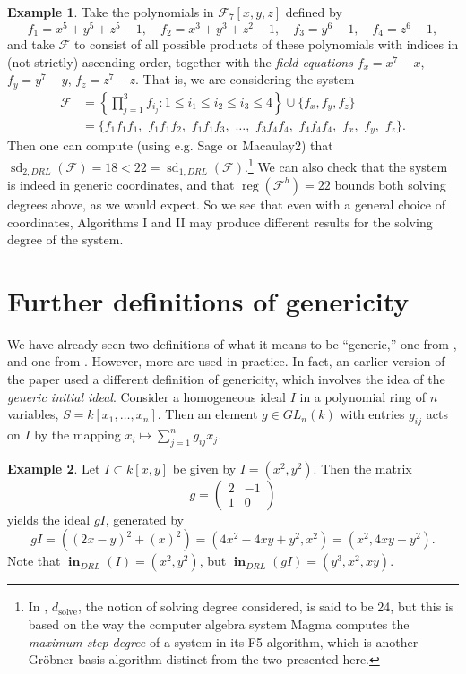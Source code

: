\documentclass[11pt]{article}
\newcommand{\F}{\mathcal{F}}
\DeclareMathOperator{\Init}{\mathbf{in}}
\DeclareMathOperator{\sd}{sd}
\DeclareMathOperator{\reg}{reg}
\theoremstyle{definition}
\newtheorem{example}{Example}
\begin{document}
\begin{example}
	Take the polynomials in $\mathbb{\F}_7[x,y,z]$ defined by \[ f_1 = x^5 + y^5 + z^5 - 1, \quad f_2 = x^3 + y^3 + z^2 - 1, \quad f_3 = y^6 - 1, \quad f_4 = z^6 - 1, \] and take $\F$ to consist of all possible products of these polynomials with indices in (not strictly) ascending order, together with the \emph{field equations} $f_x = x^7 - x$, $f_y = y^7 - y$, $f_z = z^7 - z$. That is, we are considering the system \begin{align*}
		\F &= \left\{ \prod_{j = 1}^3 f_{i_j} : 1 \leq i_1 \leq i_2 \leq i_3 \leq 4 \right\} \cup \{f_x, f_y, f_z\} \\
		&= \{f_1 f_1 f_1, \,\, f_1 f_1 f_2, \,\, f_1 f_1 f_3, \,\, \dots, \,\, f_3 f_4 f_4, \,\, f_4 f_4 f_4, \,\, f_x, \,\, f_y, \,\, f_z\}. 
	\end{align*} Then one can compute (using e.g. Sage or Macaulay2) that $\sd_{2,DRL}(\F) = 18 < 22 = \sd_{1,DRL}(\F)$.\footnote{In \cite{minko2021security}, $d_{\text{solve}}$, the notion of solving degree considered, is said to be 24, but this is based on the way the computer algebra system Magma computes the \emph{maximum step degree} of a system in its F5 algorithm, which is another Gröbner basis algorithm distinct from the two presented here.} We can also check that the system is indeed in generic coordinates, and that $\reg(\F^h) = 22$ bounds both solving degrees above, as we would expect. So we see that even with a general choice of coordinates, Algorithms I and II may produce different results for the solving degree of the system.  
\end{example}


\section{Further definitions of genericity}

We have already seen two definitions of what it means to be ``generic,'' one from \cite{bayer1987criterion}, and one from \cite{caminata2020solving}. However, more are used in practice. In fact, an earlier version of the \cite{caminata2020solving} paper used a different definition of genericity, which involves the idea of the \emph{generic initial ideal}. Consider a homogeneous ideal $I$ in a polynomial ring of $n$ variables, $S = k[x_1, \dots, x_n]$. Then an element $g \in GL_n(k)$ with entries $g_{ij}$ acts on $I$ by the mapping $x_i \mapsto \sum_{j = 1}^n g_{ij} x_j$. 

\begin{example}
	Let $I \subset k[x,y]$ be given by $I = (x^2, y^2)$. Then the matrix \[ g = \begin{pmatrix}
	2 & -1 \\
	1 & 0
\end{pmatrix} \] yields the ideal $gI$, generated by \[ gI = \left((2x - y)^2 + (x)^2\right) = (4x^2 - 4xy + y^2, x^2) = (x^2, 4xy - y^2). \] Note that $\Init_{DRL}(I) = (x^2, y^2)$, but $\Init_{DRL}(gI) = (y^3, x^2, xy)$. 
\end{example}
\end{document}
